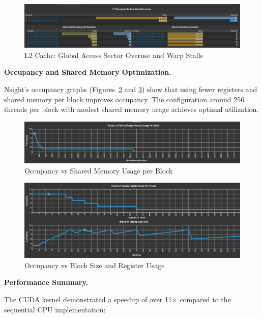 \documentclass[conference, 10pt]{IEEEtran}
\begin{document}
\begin{figure}[H]
    \centering
    \includegraphics[width=0.9\linewidth]{figures/L2.png}
    \caption{L2 Cache: Global Access Sector Overuse and Warp Stalls}
    \label{fig:l2-excess}
\end{figure}

\textbf{Occupancy and Shared Memory Optimization.}

Nsight’s occupancy graphs (Figures~\ref{fig:occupancy-shared} and \ref{fig:occupancy-block}) show that using fewer registers and shared memory per block improves occupancy. The configuration around 256 threads per block with modest shared memory usage achieves optimal utilization.

\begin{figure}[H]
    \centering
    \includegraphics[width=0.9\linewidth]{figures/ImpactOfVarying_2.png}
    \caption{Occupancy vs Shared Memory Usage per Block}
    \label{fig:occupancy-shared}
\end{figure}

\begin{figure}[H]
    \centering
    \includegraphics[width=0.9\linewidth]{figures/ImpactOfVarying.png}
    \caption{Occupancy vs Block Size and Register Usage}
    \label{fig:occupancy-block}
\end{figure}

\textbf{Performance Summary.}

The CUDA kernel demonstrated a speedup of over 11$\times$ compared to the sequential CPU implementation:
\end{document}
